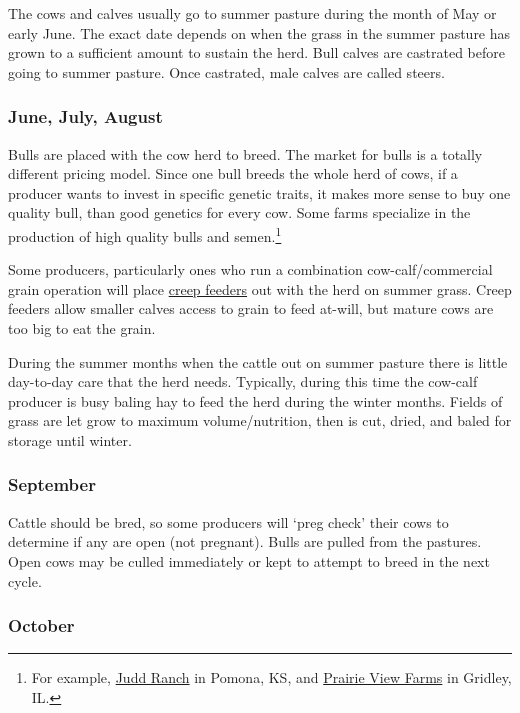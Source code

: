 \documentclass[
]{book}
\begin{document}
The cows and calves usually go to summer pasture during the month of May or early June. The exact date depends on when the grass in the summer pasture has grown to a sufficient amount to sustain the herd. Bull calves are castrated before going to summer pasture. Once castrated, male calves are called steers.

\hypertarget{june-july-august}{%
\subsubsection{June, July, August}\label{june-july-august}}

Bulls are placed with the cow herd to breed. The market for bulls is a totally different pricing model. Since one bull breeds the whole herd of cows, if a producer wants to invest in specific genetic traits, it makes more sense to buy one quality bull, than good genetics for every cow. Some farms specialize in the production of high quality bulls and semen.\footnote{For example, \href{http://www.juddranch.com/}{Judd Ranch} in Pomona, KS, and \href{http://www.pvfangus.com/}{Prairie View Farms} in Gridley, IL.}

Some producers, particularly ones who run a combination cow-calf/commercial grain operation will place \href{https://www.google.com/search?q=creep+feeder\&espv=2\&biw=1920\&bih=1075\&source=lnms\&tbm=isch\&sa=X\&ved=0CAcQ_AUoAmoVChMI18ne2paTyQIVSJUeCh3eMw5X}{creep feeders} out with the herd on summer grass. Creep feeders allow smaller calves access to grain to feed at-will, but mature cows are too big to eat the grain.

During the summer months when the cattle out on summer pasture there is little day-to-day care that the herd needs. Typically, during this time the cow-calf producer is busy baling hay to feed the herd during the winter months. Fields of grass are let grow to maximum volume/nutrition, then is cut, dried, and baled for storage until winter.

\hypertarget{september}{%
\subsubsection{September}\label{september}}

Cattle should be bred, so some producers will `preg check' their cows to determine if any are open (not pregnant). Bulls are pulled from the pastures. Open cows may be culled immediately or kept to attempt to breed in the next cycle.

\hypertarget{october}{%
\subsubsection{October}\label{october}}
\end{document}
